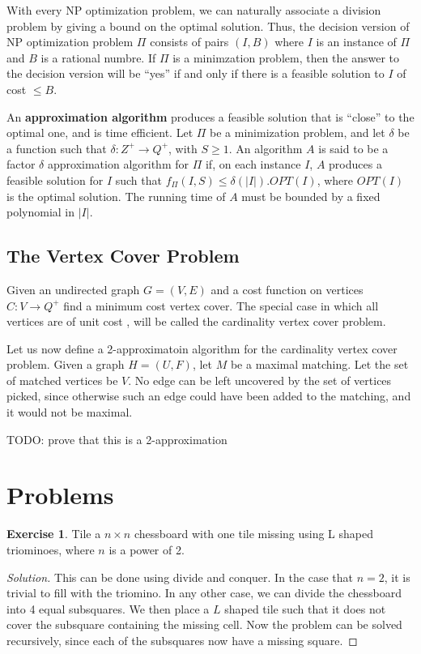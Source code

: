 \documentclass[12pt,letterpaper]{article}
\theoremstyle{definition}
\newtheorem*{exercise}{Exercise}
\newenvironment{solution}
  {\renewcommand\qedsymbol{$\blacksquare$}\begin{proof}[Solution]}
  {\end{proof}}
\begin{document}
With every NP optimization problem, we can naturally associate a division problem by giving a bound on the optimal solution. Thus, the decision version of NP optimization problem $\Pi$ consists of pairs $(I,B)$ where $I$ is an instance of $\Pi$ and $B$ is a rational numbre. If $\Pi$ is a minimzation problem, then the answer to the decision version will be ``yes'' if and only if there is a feasible solution to $I$ of cost $\leq B$.

An \textbf{approximation algorithm}  produces a feasible solution that is ``close'' to the optimal one, and is time efficient. Let $\Pi$ be a minimization problem, and let $\delta$ be a function such that $\delta:Z^+ \rightarrow Q^+$, with $S \geq 1$. An algorithm $A$ is said to be a factor $\delta$ approximation algorithm for $\Pi$ if, on each instance $I$, $A$ produces a feasible solution for $I$ such that $f_\Pi(I,S) \leq \delta(|I|). OPT(I)$, where $OPT(I)$ is the optimal solution. The running time of $A$ must be bounded by a fixed polynomial in $|I|$.

\subsection{The Vertex Cover Problem}

Given an undirected graph $G = (V,E)$ and a cost function on vertices $C:V \rightarrow Q^+$ find a minimum cost vertex cover. The special case in which all vertices are of unit cost , will be called the cardinality vertex cover problem.

Let us now define a 2-approximatoin algorithm for the cardinality vertex cover problem. Given a graph $H = (U,F)$, let $M$ be a maximal matching. Let the set of matched vertices be $V$. No edge can be left uncovered by the set of vertices picked, since otherwise such an edge could have been added to the matching, and it would not be maximal.

TODO: prove that this is a 2-approximation

\section{Problems}

\begin{exercise}
  Tile a $n \times n$ chessboard with one tile missing using L shaped triominoes, where $n$ is a power of 2.
\end{exercise}
\begin{solution}
  This can be done using divide and conquer. In the case that $n = 2$, it is trivial to fill with the triomino.
  In any other case, we can divide the chessboard into 4 equal subsquares. We then place a $L$ shaped tile such that it does not cover the subsquare containing the missing cell. Now the problem can be solved recursively, since each of the subsquares now have a missing square.
\end{solution}
\end{document}
